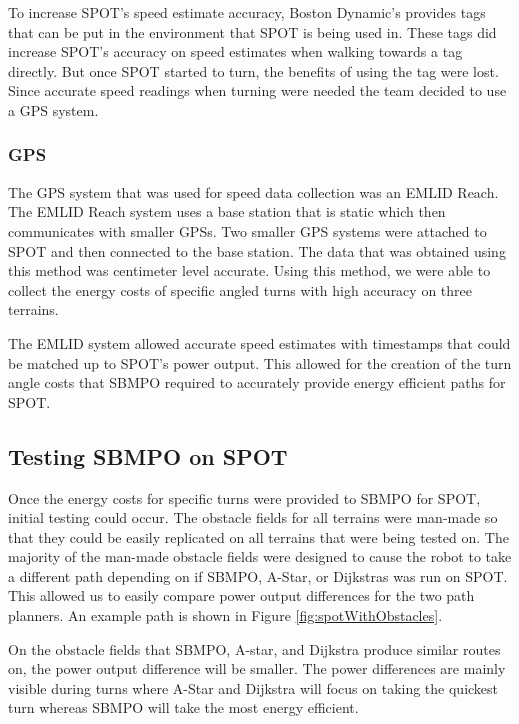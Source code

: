 \documentclass[conference]{IEEEtran}
\begin{document}
            To increase SPOT's speed estimate accuracy, Boston Dynamic's provides tags that can be put in the environment that SPOT is being used in. These tags did increase SPOT's accuracy on speed estimates when walking towards a tag directly. But once SPOT started to turn, the benefits of using the tag were lost. Since accurate speed readings when turning were needed the team decided to use a GPS system.\\
            
        \subsubsection{GPS}
            The GPS system that was used for speed data collection was an EMLID Reach. The EMLID Reach system uses a base station that is static which then communicates with smaller GPSs. Two smaller GPS systems were attached to SPOT and then connected to the base station. The data that was obtained using this method was centimeter level accurate. Using this method, we were able to collect the energy costs of specific angled turns with high accuracy on three terrains.
            
            The EMLID system allowed accurate speed estimates with timestamps that could be matched up to SPOT's power output. This allowed for the creation of the turn angle costs that SBMPO required to accurately provide energy efficient paths for SPOT.
            
\subsection{Testing SBMPO on SPOT}
    
    Once the energy costs for specific turns were provided to SBMPO for SPOT, initial testing could occur. The obstacle fields for all terrains were man-made so that they could be easily replicated on all terrains that were being tested on. The majority of the man-made obstacle fields were designed to cause the robot to take a different path depending on if SBMPO, A-Star, or Dijkstras was run on SPOT. This allowed us to easily compare power output differences for the two path planners. An example path is shown in Figure \ref{fig:spotWithObstacles}.
    
    On the obstacle fields that SBMPO, A-star, and Dijkstra produce similar routes on, the power output difference will be smaller. The power differences are mainly visible during turns where A-Star and Dijkstra will focus on taking the quickest turn whereas SBMPO will take the most energy efficient.
     
\end{document}
